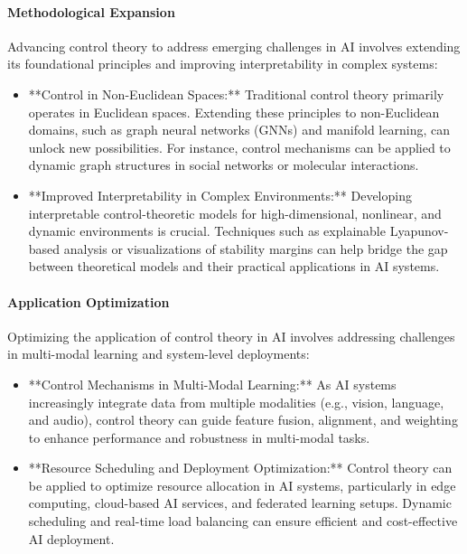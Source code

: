 \documentclass{IEEEojcsys}
\begin{document}
\paragraph{Methodological Expansion}
Advancing control theory to address emerging challenges in AI involves extending its foundational principles and improving interpretability in complex systems:
\begin{itemize}
    \item **Control in Non-Euclidean Spaces:** Traditional control theory primarily operates in Euclidean spaces. Extending these principles to non-Euclidean domains, such as graph neural networks (GNNs) and manifold learning, can unlock new possibilities. For instance, control mechanisms can be applied to dynamic graph structures in social networks or molecular interactions.
    \item **Improved Interpretability in Complex Environments:** Developing interpretable control-theoretic models for high-dimensional, nonlinear, and dynamic environments is crucial. Techniques such as explainable Lyapunov-based analysis or visualizations of stability margins can help bridge the gap between theoretical models and their practical applications in AI systems.
\end{itemize}

\paragraph{Application Optimization}
Optimizing the application of control theory in AI involves addressing challenges in multi-modal learning and system-level deployments:
\begin{itemize}
    \item **Control Mechanisms in Multi-Modal Learning:** As AI systems increasingly integrate data from multiple modalities (e.g., vision, language, and audio), control theory can guide feature fusion, alignment, and weighting to enhance performance and robustness in multi-modal tasks.
    \item **Resource Scheduling and Deployment Optimization:** Control theory can be applied to optimize resource allocation in AI systems, particularly in edge computing, cloud-based AI services, and federated learning setups. Dynamic scheduling and real-time load balancing can ensure efficient and cost-effective AI deployment.
\end{itemize}
\end{document}

